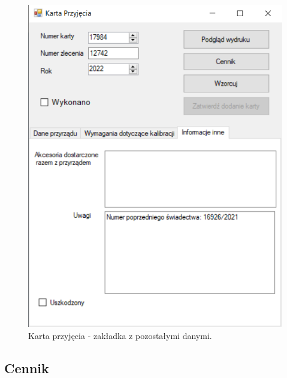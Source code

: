 \begin{figure}[htb]
	\centering
	\includegraphics{obrazki/Biuro/karta/karta_dane_inne.png}
	\caption{Karta przyjęcia - zakładka z pozostałymi danymi.}
	\label{kartaDaneInne}
\end{figure}


\subsection{Cennik}
\label{cennik}

